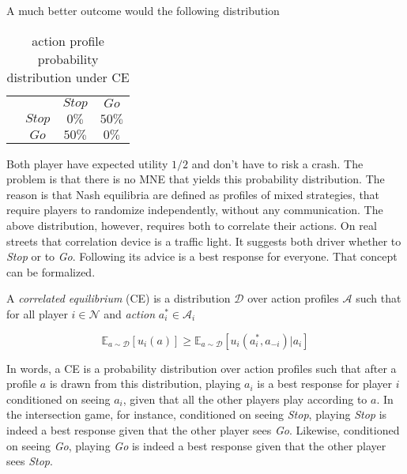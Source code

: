 A much better outcome would the following distribution

\begin{table}[H]\centering
\setlength{\extrarowheight}{2pt}
\begin{tabular}{cc|c|c|}
  & \multicolumn{1}{c}{} & \multicolumn{1}{c}{$Stop$}  & \multicolumn{1}{c}{$Go$} \\\cline{3-4}
  & $Stop$ & $0\%$ & $50\%$ \\\cline{3-4}
  & $Go$ & $50\%$ & $0\%$ \\\cline{3-4}
\end{tabular}\caption{\label{tab:probabilityUnderCE}action profile probability distribution under CE}
\end{table}

Both player have expected utility $1/2$ and don't have to risk a crash. The problem is that there is no MNE that yields this probability distribution. The reason is that Nash equilibria are defined as profiles of mixed strategies, that require players to randomize independently, without any
communication. The above distribution, however, requires both to correlate their actions. On real streets that correlation device is a traffic light. It suggests both driver whether to \textit{Stop} or to \textit{Go}. Following its advice is a best response for everyone. That concept can be formalized. 

\begin{definition}\label{def:CE}
    A \textit{correlated equilibrium} (CE) is a distribution $\mathcal{D}$ over action profiles $\mathcal{A}$ such that for all player $i \in \mathcal{N}$ and \textit{action} $a_{i}^{*} \in \mathcal{A}_i$
    
    \[\mathbb{E}_{a \sim \mathcal{D}}[u_i(a)] \ge \mathbb{E}_{a \sim \mathcal{D}}[u_i(a_{i}^{*},a_{-i})|a_i]\]
\end{definition}

In words, a CE is a probability distribution over action profiles such that after a profile $a$ is drawn from this distribution, playing $a_i$ is a best response for player $i$ conditioned on seeing $a_i$, given that all the other players play according to $a$. In the intersection game, for instance, conditioned on seeing \textit{Stop}, playing \textit{Stop} is indeed a best response given that the other player sees \textit{Go}. Likewise, conditioned on seeing \textit{Go}, playing \textit{Go} is indeed a best response given that the other player sees \textit{Stop}. \\

